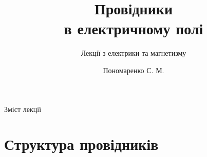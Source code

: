 \documentclass[onlytextwidth]{beamer}
\title[Лекції електрики та магнетизму]{\huge\bfseries Провідники \\ в електричному полі}
\subtitle{Лекції з електрики та магнетизму}
\author{Пономаренко С. М.}
\date{}
\begin{document}
\begin{frame}[plain]
	\maketitle
\end{frame}

\begin{frame}{Зміст лекції}{}
       \tableofcontents
\end{frame}

\section{Структура провідників}
\end{document}
